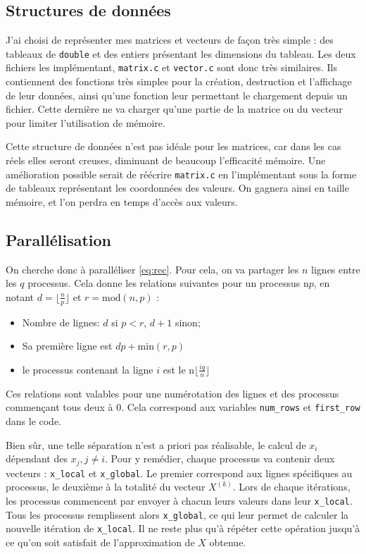 \documentclass[11pt, a4paper]{article}
\begin{document}
\subsection{Structures de données}
J'ai choisi de représenter mes matrices et vecteurs de façon très simple :
des tableaux de \lstinline{double} et des entiers présentant les dimensions du tableau.
Les deux fichiers les implémentant, \texttt{matrix.c} et \texttt{vector.c} sont donc très similaires.
Ils contiennent des fonctions très simples pour la création, destruction et l'affichage de leur données, ainsi qu'une fonction leur permettant le chargement depuis un fichier. Cette dernière ne va charger qu'une partie de la matrice ou du vecteur pour limiter l'utilisation de mémoire.

\bigskip
Cette structure de données n'est pas idéale pour les matrices, car dans les cas réels elles seront creuses, diminuant de beaucoup l'efficacité mémoire.
Une amélioration possible serait de réécrire \texttt{matrix.c} en l'implémentant sous la forme de tableaux représentant les coordonnées des valeurs.
On gagnera ainsi en taille mémoire, et l'on perdra en temps d'accès aux valeurs.

\subsection{Parallélisation}

On cherche donc à paralléliser \eqref{eq:rec}.
Pour cela, on va partager les \(n\) lignes entre les \(q\) processus.
Cela donne les relations suivantes pour un processus n\textdegree\(p\), en notant \(d = \lfloor \frac{n}{p} \rfloor\) et \(r = \text{mod}(n,p)\) :
\begin{itemize}
    \item Nombre de lignes:  \(d\) si \(p<r\), \(d+1\) sinon;
    \item Sa première ligne est \(dp+\text{min}(r,p)\)
    \item le processus contenant la ligne \(i\) est le n\textdegree\(\lfloor \frac{iq}{n} \rfloor\)
\end{itemize}
Ces relations sont valables pour une numérotation des lignes et des processus commençant tous deux à 0.
Cela correspond aux variables \lstinline{num_rows} et
\lstinline{first_row} dans le code.

\bigskip

Bien sûr, une telle séparation n'est a priori pas réalisable, le calcul de \(x_i\) dépendant des \(x_j, j \neq i\).
Pour y remédier, chaque processus va contenir deux vecteurs : \lstinline{x_local} et \lstinline{x_global}.
Le premier correspond aux lignes spécifiques au processus, le deuxième à la totalité du vecteur \(X^{(k)}\).
Lors de chaque itérations, les processus commencent par envoyer à chacun leurs valeurs dans leur \lstinline{x_local}.
Tous les processus remplissent alors \lstinline{x_global}, ce qui leur permet de calculer la nouvelle itération de \lstinline{x_local}.
Il ne reste plus qu'à répéter cette opération jusqu'à ce qu'on soit satisfait de l'approximation de \(X\) obtenue.
\end{document}
